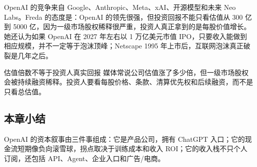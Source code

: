 OpenAI 的竞争来自 Google、Anthropic、Meta、xAI、开源模型和未来 Neo Labs。Freda 的态度是：OpenAI 的领先很强，但投资回报不能只看估值从 300 亿到 5000 亿，因为一级市场股权稀释很严重，投资人真正拿到的是每股价值增长。她还认为如果 OpenAI 在 2027 年左右以 1 万亿美元市值 IPO，只要收入能做到相应规模，并不一定等于泡沫顶峰；Netscape 1995 年上市后，互联网泡沫真正破裂是几年之后。

\begin{warningbox}{估值倍数不等于投资人真实回报}
媒体常说公司估值涨了多少倍，但一级市场股权会被持续融资稀释。投资人要看每股价格、条款、清算优先权和后续融资，而不是只看总估值。
\end{warningbox}

\subsection{本章小结}

OpenAI 的资本叙事由三件事组成：它是产品公司，拥有 ChatGPT 入口；它的现金流短期像负向滚雪球，拐点取决于训练成本和收入 ROI；它的收入栈不只个人订阅，还包括 API、Agent、企业入口和广告/电商。

